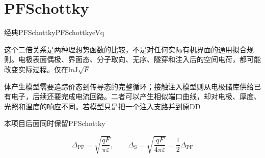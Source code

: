 \documentclass[11pt,a4paper]{article}
\begin{document}
\section{PF\allowbreak{}Schottky\allowbreak{}}\label{sec:18}
{\cjkfont 经典}\allowbreak{}PF\allowbreak{}Schottky\allowbreak{}PF\allowbreak{}Schottky\allowbreak{}eV\allowbreak{}q\allowbreak{}
\par
{\cjkfont 这个二倍关系是两种理想势函数的比较，不是对任何实际有机界面的通用拟合规则。电极表面偶极、界面态、分子取向、无序、隧穿和注入后的空间电荷，都可能改变实际过程。仅在}\allowbreak{}lnJ\allowbreak{}\allowbreak{}\ensuremath{\sqrt{F}}\allowbreak{}
\par
{\cjkfont 体产生模型需要追踪价态到传导态的完整循环；接触注入模型则从电极储库供给已有电子，后续还要完成电流回路。二者可以产生相似端口曲线，却对电极、厚度、光照和温度的响应不同。若模型只是把一个注入支路并到原}\allowbreak{}DD\allowbreak{}
\par
{\cjkfont 本项目后面同时保留}\allowbreak{}PF\allowbreak{}Schottky\allowbreak{}
\par
\begin{equation}
\Delta_{\mathrm{PF}}=\sqrt{\frac{qF}{\pi\varepsilon}},\qquad \Delta_{\mathrm{S}}=\sqrt{\frac{qF}{4\pi\varepsilon}}=\frac{1}{2}\Delta_{\mathrm{PF}}
\label{eq:20}\end{equation}
\end{document}
